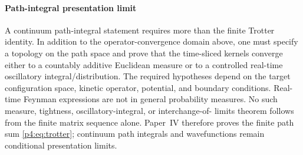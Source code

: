 \documentclass[12pt,a4paper]{article}
\begin{document}
\paragraph{Path-integral presentation limit}
\label{p4:sec:part2-path-integral-limit}

A continuum path-integral statement requires more than the finite Trotter
identity.  In addition to the operator-convergence domain above, one must
specify a topology on the path space and prove that the time-sliced kernels
converge either to a countably additive Euclidean measure or to a controlled
real-time oscillatory integral/distribution.  The required hypotheses depend
on the target configuration space, kinetic operator, potential, and boundary
conditions.  Real-time Feynman expressions are not in general probability
measures.  No such measure, tightness, oscillatory-integral, or interchange-of-
limits theorem follows from the finite matrix sequence alone.  Paper~IV
therefore proves the finite path sum \eqref{p4:eq:trotter}; continuum path
integrals and wavefunctions remain conditional presentation limits.
\end{document}

